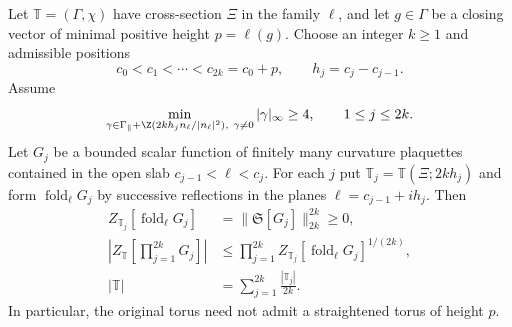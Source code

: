 \begin{proposition}\label{prop:unequal-slabs}
Let $\mathbb T=(\Gamma,\chi)$ have cross-section $\Xi$ in the family
$\ell$, and let $g\in\Gamma$ be a closing vector of minimal positive
height $p=\ell(g)$. Choose an integer $k\ge1$ and admissible positions
\[
 c_0<c_1<\cdots<c_{2k}=c_0+p,\qquad h_j=c_j-c_{j-1}.
\]
Assume
\begin{equation}\label{eq:sides-systole}
 \min_{\gamma\in\Gamma_\parallel+
       \Z(2kh_j n_\ell/|n_\ell|^2),\ \gamma\ne0}
       |\gamma|_\infty\ge4,\qquad 1\le j\le2k.
\end{equation}
Let $G_j$ be a bounded scalar function of finitely many curvature
plaquettes contained in the open slab $c_{j-1}<\ell<c_j$.
For each $j$ put $\mathbb T_j=\mathbb T(\Xi;2kh_j)$ and form
$\operatorname{fold}_\ell G_j$ by successive reflections in the
planes $\ell=c_{j-1}+ih_j$. Then
\begin{align}
 Z_{\mathbb T_j}[\operatorname{fold}_\ell G_j]
   &=\|\mathfrak S[G_j]\|_{2k}^{2k}\ge0,
       \label{eq:sides-slab-norm}\\
 \left|Z_{\mathbb T}\left[\prod_{j=1}^{2k}G_j\right]\right|
   &\le\prod_{j=1}^{2k}
       Z_{\mathbb T_j}[\operatorname{fold}_\ell G_j]^{1/(2k)},
       \label{eq:sides-holder}\\
 |\mathbb T|&=\sum_{j=1}^{2k}\frac{|\mathbb T_j|}{2k}.
       \label{eq:sides-volumes}
\end{align}
In particular, the original torus need not admit a straightened torus
of height $p$.
\end{proposition}

